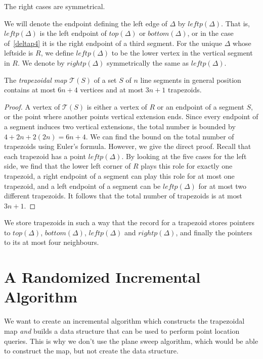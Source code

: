 The right cases are symmetrical.

We will denote the endpoint defining the left edge of \(\Delta\) by $leftp(\Delta)$. That is, $leftp(\Delta)$ is the left endpoint of $top(\Delta)$ or $bottom(\Delta)$, or in the case of~\autoref{deltap4} it is the right endpoint of a third segment. For the unique \(\Delta\) whose leftside is $R$, we define $leftp(\Delta)$ to be the lower vertex in the vertical segment in $R$. We denote by $rightp(\Delta)$ symmetrically the same as $leftp(\Delta)$.

\begin{lemma}
	The \textit{trapezoidal map} $\mathcal{T}(S)$ of a set $S$ of $n$ line segments in general position contains at most $6n+4$ vertices and at most $3n+1$ trapezoids.
\end{lemma}

\begin{proof}
	A vertex of $\mathcal{T}(S)$ is either a vertex of $R$ or an endpoint of a segment $S$, or the point where another points vertical extension ends. Since every endpoint of a segment induces two vertical extensions, the total number is bounded by $4 + 2n + 2(2n) = 6n+4$. We can find the bound on the total number of trapezoids using Euler's formula. However, we give the direct proof. Recall that each trapezoid has a point $leftp(\Delta)$. By looking at the five cases for the left side, we find that the lower left corner of $R$ plays this role for exactly one trapezoid, a right endpoint of a segment can play this role for at most one trapezoid, and a left endpoint of a segment can be $leftp(\Delta)$ for at most two different trapezoids. It follows that the total number of trapezoids is at most $3n+1$.
\end{proof}


We store trapezoids in such a way that the record for a trapezoid stores pointers to $top(\Delta)$, $bottom(\Delta)$, $leftp(\Delta)$ and $rightp(\Delta)$, and finally the pointers to its at most four neighbours.

\section{A Randomized Incremental Algorithm}%
\label{sec:label}

We want to create an incremental algorithm which constructs the trapezoidal map \textit{and} builds a data structure that can be used to perform point location queries. This is why we don't use the plane sweep algorithm, which would be able to construct the map, but not create the data structure.



